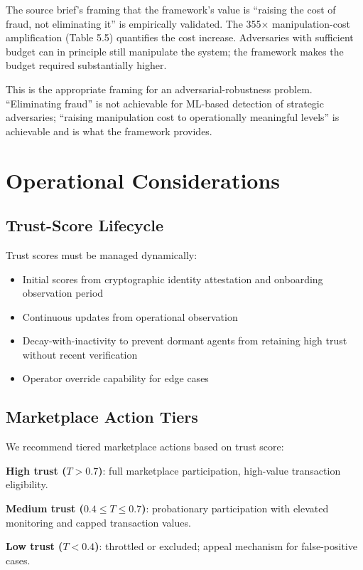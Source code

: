 \documentclass[sigconf,nonacm]{acmart}
\begin{document}
The source brief's framing that the framework's value is ``raising
the cost of fraud, not eliminating it'' is empirically validated.
The 355$\times$ manipulation-cost amplification (Table 5.5)
quantifies the cost increase. Adversaries with sufficient budget
can in principle still manipulate the system; the framework makes
the budget required substantially higher.

This is the appropriate framing for an adversarial-robustness
problem. ``Eliminating fraud'' is not achievable for ML-based
detection of strategic adversaries; ``raising manipulation cost
to operationally meaningful levels'' is achievable and is what
the framework provides.

\section{Operational Considerations}

\subsection{Trust-Score Lifecycle}

Trust scores must be managed dynamically:

\begin{itemize}
  \item Initial scores from cryptographic identity attestation
        and onboarding observation period
  \item Continuous updates from operational observation
  \item Decay-with-inactivity to prevent dormant agents from
        retaining high trust without recent verification
  \item Operator override capability for edge cases
\end{itemize}

\subsection{Marketplace Action Tiers}

We recommend tiered marketplace actions based on trust score:

\textbf{High trust ($T > 0.7$)}: full marketplace participation,
high-value transaction eligibility.

\textbf{Medium trust ($0.4 \leq T \leq 0.7$)}: probationary
participation with elevated monitoring and capped transaction
values.

\textbf{Low trust ($T < 0.4$)}: throttled or excluded; appeal
mechanism for false-positive cases.
\end{document}
